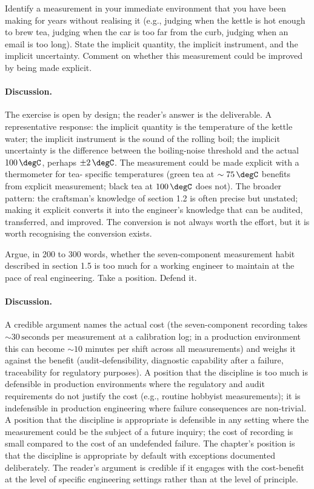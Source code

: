\begin{exercise}
Identify a measurement in your immediate environment that you have
been making for years without realising it (e.g., judging when the
kettle is hot enough to brew tea, judging when the car is too far
from the curb, judging when an email is too long). State the implicit
quantity, the implicit instrument, and the implicit uncertainty.
Comment on whether this measurement could be improved by being made
explicit.

\paragraph{Discussion.} The exercise is open by design; the
reader's answer is the deliverable. A representative response: the
implicit quantity is the temperature of the kettle water; the
implicit instrument is the sound of the rolling boil; the implicit
uncertainty is the difference between the boiling-noise threshold
and the actual $100 \,\degC$, perhaps $\pm 2 \,\degC$. The
measurement could be made explicit with a thermometer for tea-
specific temperatures (green tea at $\sim 75 \,\degC$ benefits from
explicit measurement; black tea at $100 \,\degC$ does not). The
broader pattern: the craftsman's knowledge of section 1.2 is often
precise but unstated; making it explicit converts it into the
engineer's knowledge that can be audited, transferred, and
improved. The conversion is not always worth the effort, but it is
worth recognising the conversion exists.
\end{exercise}

\begin{exercise}
Argue, in 200 to 300 words, whether the seven-component measurement
habit described in section 1.5 is too much for a working engineer
to maintain at the pace of real engineering. Take a position. Defend
it.

\paragraph{Discussion.} A credible argument names the actual cost
(the seven-component recording takes $\sim 30 \,\text{seconds}$
per measurement at a calibration log; in a production environment
this can become $\sim 10$ minutes per shift across all
measurements) and weighs it against the benefit (audit-defensibility,
diagnostic capability after a failure, traceability for regulatory
purposes). A position that the discipline is too much is defensible
in production environments where the regulatory and audit
requirements do not justify the cost (e.g., routine hobbyist
measurements); it is indefensible in production engineering where
failure consequences are non-trivial. A position that the discipline
is appropriate is defensible in any setting where the measurement
could be the subject of a future inquiry; the cost of recording is
small compared to the cost of an undefended failure. The chapter's
position is that the discipline is appropriate by default with
exceptions documented deliberately. The reader's argument is
credible if it engages with the cost-benefit at the level of
specific engineering settings rather than at the level of
principle.
\end{exercise}
